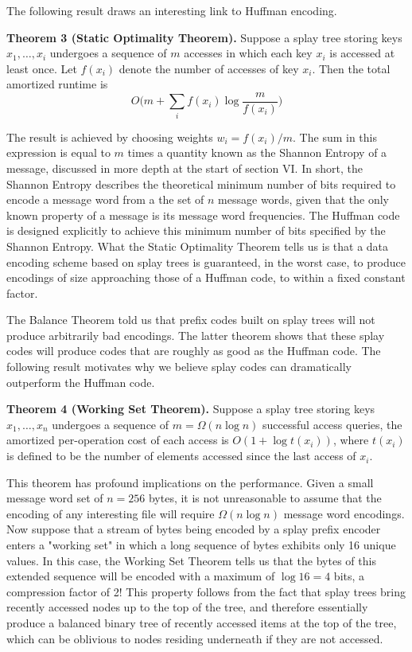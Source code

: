 \documentclass[twoside]{article}
\begin{document}
\begin{multicols}{2}
The following result draws an interesting link to Huffman encoding.

\vspace{0.5em}
\noindent \textbf{Theorem 3 (Static Optimality Theorem).} Suppose a splay tree storing keys $x_1, \dots, x_i$ undergoes a sequence of $m$ accesses in which each key $x_i$ is accessed at least once. Let $f(x_i)$ denote the number of accesses of key $x_i$. Then the total amortized runtime is 
\[
O \big ( m + \sum_i f(x_i) \log \frac{m}{f(x_i)} \big )
\]

\vspace{0.5em}
The result is achieved by choosing weights $w_i = f(x_i)/m$. The sum in this expression is equal to $m$ times a quantity known as the Shannon Entropy of a message, discussed in more depth at the start of section VI. In short, the Shannon Entropy describes the theoretical minimum number of bits required to encode a message word from a the set of $n$ message words, given that the only known property of a message is its message word frequencies. The Huffman code is designed explicitly to achieve this minimum number of bits specified by the Shannon Entropy. What the Static Optimality Theorem tells us is that a data encoding scheme based on splay trees is guaranteed, in the worst case, to produce encodings of size approaching those of a Huffman code, to within a fixed constant factor.

The Balance Theorem told us that prefix codes built on splay trees will not produce arbitrarily bad encodings. The latter theorem shows that these splay codes will produce codes that are roughly as good as the Huffman code. The following result motivates why we believe splay codes can dramatically outperform the Huffman code.

\vspace{0.5em}
\noindent \textbf{Theorem 4 (Working Set Theorem). } Suppose a splay tree storing keys $x_1, \dots, x_n$ undergoes a sequence of $m = \Omega(n \log n)$ successful access queries, the amortized per-operation cost of each access is $O(1 + \log t(x_i))$, where $t(x_i)$ is defined to be the number of elements accessed since the last access of $x_i$.

This theorem has profound implications on the performance. Given a small message word set of $n = 256$ bytes, it is not unreasonable to assume that the encoding of any interesting file will require $\Omega (n \log n)$ message word encodings. Now suppose that a stream of bytes being encoded by a splay prefix encoder enters a "working set" in which a long sequence of bytes exhibits only 16 unique values. In this case, the Working Set Theorem tells us that the bytes of this extended sequence will be encoded with a maximum of $\log 16 = 4$ bits, a compression factor of 2! This property follows from the fact that splay trees bring recently accessed nodes up to the top of the tree, and therefore essentially produce a balanced binary tree of recently accessed items at the top of the tree, which can be oblivious to nodes residing underneath if they are not accessed.


\end{multicols}
\end{document}
